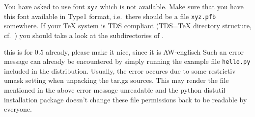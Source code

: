\documentclass[11pt,DIV14]{scrartcl}
\begin{document}
{}
{\label{q:fontshape_undefined}
You have asked to use font \texttt{xyz} which is not available. Make sure that
you have this font available in Type1 format, i.e.\ there should be a 
file \texttt{xyz.pfb} somewhere. If your \TeX{} system is TDS compliant 
(TDS=\TeX{} directory structure, cf.\ ) 
you should take a look at the subdirectories of 
.
}

{this is for 0.5 already, please make it nice, since it is AW-englisch}
{\label{q:no_lfs}
Such an error message can already be encountered by simply running the
example file \texttt{hello.py} included in the \PyX{} distribution.
Usually, the error occures due to some restrictiv umask setting when
unpacking the tar.gz sources. This may render the file mentioned in
the above error message unreadable and the python distutil
installation package doesn't change these file permissions back to be
readable by everyone.}
\end{document}
